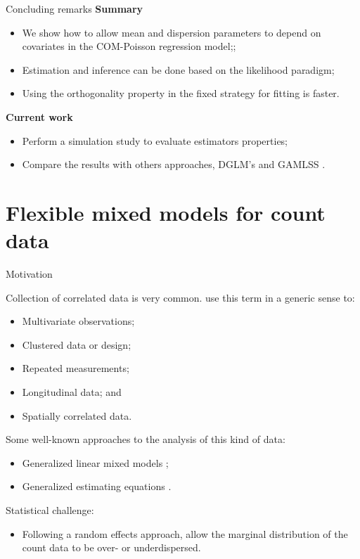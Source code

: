 \documentclass[11pt]{beamer}\usepackage[]{graphicx}\usepackage[]{color}
\begin{document}
\begin{frame}{Concluding remarks}
  \textbf{Summary}
  \begin{itemize}
  \item We show how to allow mean and dispersion parameters to depend
    on covariates in the COM-Poisson regression model;;
  \item Estimation and inference can be done based on the likelihood
    paradigm;
  \item Using the orthogonality property in the fixed strategy for
    fitting is faster.
  \end{itemize}
  \vspace{0.5cm}
  \textbf{Current work}
  \begin{itemize}
    \item Perform a simulation study to evaluate estimators properties;
    \item Compare the results with others approaches, DGLM's
      \citep{Lee2006} and GAMLSS \citep{Rigby2005}.
  \end{itemize}
\end{frame}

\section{Flexible mixed models for count data}

\begin{frame}{Motivation}

  Collection of correlated data is very common. \citet{Molenberghs2005}
  use this term in a generic sense to:
  \begin{itemize}
    \item Multivariate observations;
    \item Clustered data or design;
    \item Repeated measurements;
    \item Longitudinal data; and
    \item Spatially correlated data.
  \end{itemize}
  \vspace{0.2cm}

  Some well-known approaches to the analysis of this kind of data:
  \begin{itemize}
    \item Generalized linear mixed models \citep{Breslow1993};
    \item Generalized estimating equations \citep{Liang1986}.
  \end{itemize}
  \vspace{0.2cm}

  Statistical challenge:
  \begin{itemize}
    \item Following a random effects approach, allow the marginal
      distribution of the count data to be over- or underdispersed.
  \end{itemize}
\end{frame}
\end{document}
